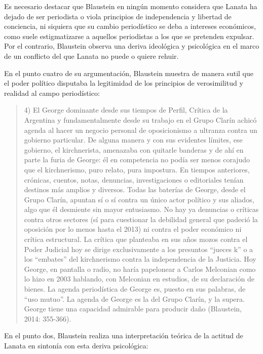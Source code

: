 {Es necesario destacar que Blaustein en ningún momento considera que Lanata ha dejado de ser periodista o viola principios de independencia y libertad de conciencia, ni siquiera que su cambio periodístico se deba a intereses económicos, como suele estigmatizarse a aquellos periodistas a los que se pretenden expulsar. Por el contrario, Blaustein observa una deriva ideológica y psicológica en el marco de un conflicto del que Lanata no puede o quiere rehuir.

En el punto cuatro de su argumentación, Blaustein muestra de manera sutil que el poder político disputaba la legitimidad de los principios de verosimilitud y realidad al campo periodístico:

\begin{quote}
4) El George dominante desde sus tiempos de Perfil, Crítica de la Argentina y fundamentalmente desde su trabajo en el Grupo Clarín achicó agenda al hacer un negocio personal de oposicionismo a ultranza contra un gobierno particular. De alguna manera y con sus evidentes límites, ese gobierno, el kirchnerista, amenazaba con quitarle banderas y de ahí en parte la furia de George: él en competencia no podía ser menos corajudo que el kirchnerismo, puro relato, pura impostura. En tiempos anteriores, crónicas, cuentos, notas, denuncias, investigaciones o editoriales tenían destinos más amplios y diversos. Todas las baterías de George, desde el Grupo Clarín, apuntan sí o sí contra un único actor político y sus aliados, algo que él desmiente sin mayor entusiasmo. No hay ya denuncias o críticas contra otros sectores (sí para cuestionar la debilidad general que padeció la oposición por lo menos hasta el 2013) ni contra el poder económico ni crítica estructural. La crítica que planteaba en sus años mozos contra el Poder Judicial hoy se dirige exclusivamente a los presuntos ``jueces k'' o a los ``embates'' del kirchnerismo contra la independencia de la Justicia. Hoy George, en pantalla o radio, no haría papelonear a Carlos Melconian como lo hizo en 2003 hablando, con Melconian en estudios, de su declaración de bienes. La agenda periodística de George es, puesto en sus palabras, de ``uso mutuo''. La agenda de George es la del Grupo Clarín, y la supera. George tiene una capacidad admirable para producir daño (Blaustein, 2014: 355-366).
\end{quote}

En el punto dos, Blaustein realiza una interpretación teórica de la actitud de Lanata en sintonía con esta deriva psicológica:

}
